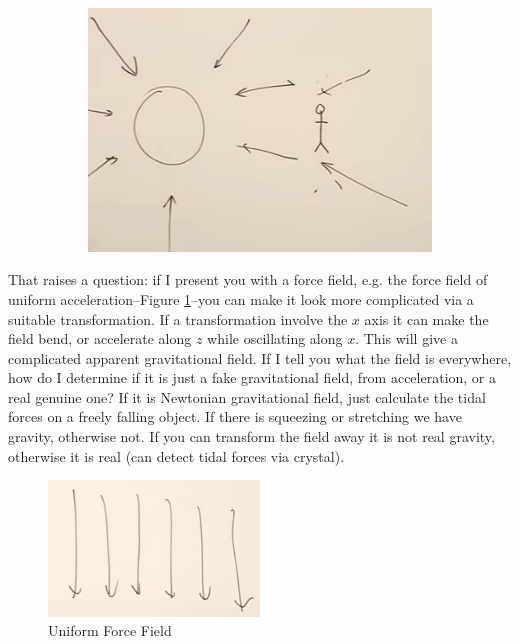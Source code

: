 \documentclass[]{article}
\begin{document}
\begin{figure}[H]
\begin{center}
\begin{subfigure}[t]{0.45\textwidth}
			\includegraphics[width=\textwidth]{gr-1-suns-gravitational-field-2000-mile}
		\end{subfigure}
	\end{center}
\end{figure}

That raises a question: if I present you with a force field, e.g. the force field of uniform acceleration--Figure \ref{fig:gr-1-uniform-force-field}--you can make it look more complicated via a suitable transformation. If a transformation involve the $x$ axis it can make the field bend, or accelerate along $z$ while oscillating along $x$. This will give a complicated apparent gravitational field. If I tell you what the field is everywhere, how do I determine if it is just a fake gravitational field, from acceleration, or a real genuine one? If it is Newtonian gravitational field, just calculate the tidal forces on a freely falling object. If there is squeezing or stretching we have gravity,  otherwise not. If you can transform the field away it is not real gravity, otherwise it is real (can detect tidal forces via crystal).

\begin{figure}[H]
	\begin{center}
		\caption{Uniform Force Field}\label{fig:gr-1-uniform-force-field}
		\includegraphics[width=0.5\textwidth]{gr-1-uniform-force-field}
	\end{center}
\end{figure}
\end{document}
